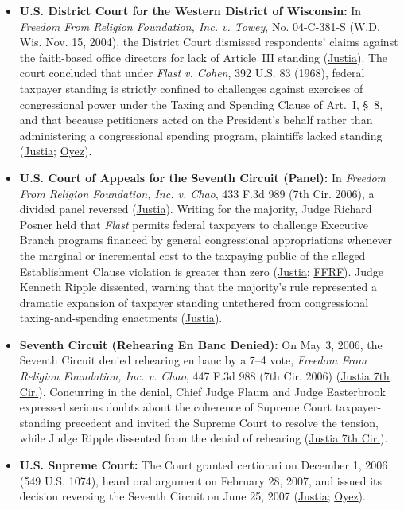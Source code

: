 \documentclass[12pt]{article}
\begin{document}
\begin{itemize}
    \item \textbf{U.S. District Court for the Western District of Wisconsin:} In \textit{Freedom From Religion Foundation, Inc. v. Towey}, No. 04-C-381-S (W.D. Wis. Nov. 15, 2004), the District Court dismissed respondents' claims against the faith-based office directors for lack of Article~III standing (\href{https://supreme.justia.com/cases/federal/us/551/587/}{Justia}). The court concluded that under \textit{Flast v. Cohen}, 392 U.S. 83 (1968), federal taxpayer standing is strictly confined to challenges against exercises of congressional power under the Taxing and Spending Clause of Art.~I, \S~8, and that because petitioners acted on the President's behalf rather than administering a congressional spending program, plaintiffs lacked standing (\href{https://supreme.justia.com/cases/federal/us/551/587/}{Justia}; \href{https://www.oyez.org/cases/2006/06-157}{Oyez}).
    \item \textbf{U.S. Court of Appeals for the Seventh Circuit (Panel):} In \textit{Freedom From Religion Foundation, Inc. v. Chao}, 433 F.3d 989 (7th Cir. 2006), a divided panel reversed (\href{https://supreme.justia.com/cases/federal/us/551/587/}{Justia}). Writing for the majority, Judge Richard Posner held that \textit{Flast} permits federal taxpayers to challenge Executive Branch programs financed by general congressional appropriations whenever the marginal or incremental cost to the taxpaying public of the alleged Establishment Clause violation is greater than zero (\href{https://supreme.justia.com/cases/federal/us/551/587/}{Justia}; \href{https://ffrf.org/news/releases/7thcwin/}{FFRF}). Judge Kenneth Ripple dissented, warning that the majority's rule represented a dramatic expansion of taxpayer standing untethered from congressional taxing-and-spending enactments (\href{https://supreme.justia.com/cases/federal/us/551/587/}{Justia}).
    \item \textbf{Seventh Circuit (Rehearing En Banc Denied):} On May 3, 2006, the Seventh Circuit denied rehearing en banc by a 7--4 vote, \textit{Freedom From Religion Foundation, Inc. v. Chao}, 447 F.3d 988 (7th Cir. 2006) (\href{https://law.justia.com/cases/federal/appellate-courts/F3/447/988/505254/}{Justia 7th Cir.}). Concurring in the denial, Chief Judge Flaum and Judge Easterbrook expressed serious doubts about the coherence of Supreme Court taxpayer-standing precedent and invited the Supreme Court to resolve the tension, while Judge Ripple dissented from the denial of rehearing (\href{https://law.justia.com/cases/federal/appellate-courts/F3/447/988/505254/}{Justia 7th Cir.}).
    \item \textbf{U.S. Supreme Court:} The Court granted certiorari on December 1, 2006 (549 U.S. 1074), heard oral argument on February 28, 2007, and issued its decision reversing the Seventh Circuit on June 25, 2007 (\href{https://supreme.justia.com/cases/federal/us/551/587/}{Justia}; \href{https://www.oyez.org/cases/2006/06-157}{Oyez}).
\end{itemize}
\end{document}
